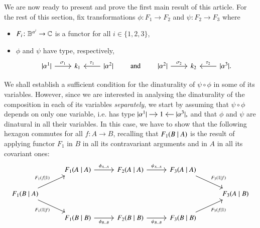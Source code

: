 We are now ready to present and prove the first main result of this article. For the rest of this section, fix transformations $\phi \colon F_1 \to F_2$ and $\psi \colon F_2 \to F_3$  where 
\begin{itemize}
	\item $F_i \colon \mathbb B^{\alpha^i} \to \mathbb C$ is a functor for all $i \in \{1,2,3\}$, 
	\item $\phi$ and $\psi$ have type, respectively,
	\[
	\begin{tikzcd}
	\length{\alpha^1} \ar[r,"\sigma_1"] & k_1 & \length{\alpha^{2}} \ar[l,"\tau_1"']
	\end{tikzcd}
	\qquad \text{and} \qquad
	\begin{tikzcd}
	\length{\alpha^2} \ar[r,"\sigma_2"] & k_2 & \length{\alpha^{3}}. \ar[l,"\tau_2"']
	\end{tikzcd}
	\]
\end{itemize}
We shall establish a sufficient condition for the dinaturality of $\psi \circ \phi$ in some of its variables. However, since we are interested in analysing the dinaturality of the composition in each of its variables \emph{separately}, we start by assuming that $\psi\circ\phi$ depends on only one variable, i.e. has type 
$
\begin{tikzcd}[cramped,sep=small]
\length{\alpha^1} \ar[r] & 1 & \length{\alpha^{3}} \ar[l],
\end{tikzcd}
$
and that $\phi$ and $\psi$ are dinatural in all their variables. In this case, we have to show that the following hexagon commutes for all $f \colon A \to B$, recalling that  $F_1 ( B \mid A )$ is the result of applying functor $F_1$ in $B$ in all its contravariant arguments and in $A$ in all its covariant ones:
\begin{equation}\label{eqn:compositionality-hexagon}
\begin{tikzcd}[column sep=1cm]
& \funminplusconst {F_1} A A \ar[r,"\phi_{A\dots A}"] &  \funminplusconst {F_2} A A \ar[r,"\psi_{A \dots A}"]  &  \funminplusconst {F_3} A A \ar[dr,"\funminplusconst {F_3} 1 f"] \\
\funminplusconst {F_1} B A \ar[ur,"\funminplusconst {F_1} f 1"] \ar[dr,"\funminplusconst {F_1} 1 f"'] & &   & & \funminplusconst {F_3} A B \\
& \funminplusconst {F_1} B B \ar[r,"\phi_{B\dots B}"']  & \funminplusconst {F_2} B B \ar[r,"\psi_{B \dots B}"']  & \funminplusconst {F_3} B B \ar[ur,"\funminplusconst {F_3} f 1"']
\end{tikzcd}
\end{equation}

